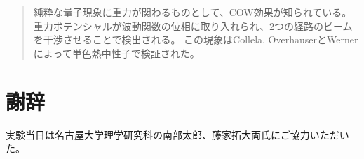 \documentclass[dvipdfmx]{jsarticle}
\begin{document}
\maketitle


\begin{abstract}
    純粋な量子現象に重力が関わるものとして、COW効果が知られている。
    \cite{COWtheory}
    重力ポテンシャルが波動関数の位相に取り入れられ、2つの経路のビームを干渉させることで検出される。
    この現象はCollela, OverhauserとWernerによって単色熱中性子で検証された。
    \cite{COWexp}
\end{abstract}




\section*{謝辞}

実験当日は名古屋大学理学研究科の南部太郎、藤家拓大両氏にご協力いただいた。



\end{document}
